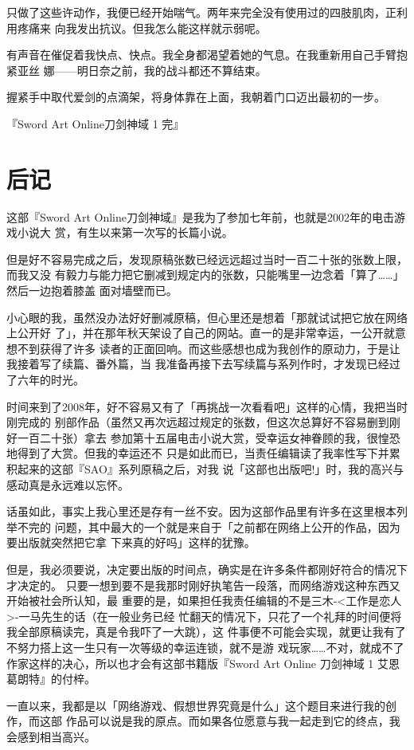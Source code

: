 \documentclass[11pt]{book}
\begin{document}
只做了这些许动作，我便已经开始喘气。两年来完全没有使用过的四肢肌肉，正利用疼痛来
向我发出抗议。但我怎么能这样就示弱呢。

有声音在催促着我快点、快点。我全身都渴望着她的气息。在我重新用自己手臂抱紧亚丝
娜——明日奈之前，我的战斗都还不算结束。

握紧手中取代爱剑的点滴架，将身体靠在上面，我朝着门口迈出最初的一步。

『Sword Art Online刀剑神域 1 完』
\chapter{后记}
\label{sec:org4f12859}
这部『Sword Art Online刀剑神域』是我为了参加七年前，也就是2002年的电击游戏小说大
赏，有生以来第一次写的长篇小说。

但是好不容易完成之后，发现原稿张数已经远远超过当时一百二十张的张数上限，而我又没
有毅力与能力把它删减到规定内的张数，只能嘴里一边念着「算了……」然后一边抱着膝盖
面对墙壁而已。

小心眼的我，虽然没办法好好删减原稿，但心里还是想着「那就试试把它放在网络上公开好
了」，并在那年秋天架设了自己的网站。直一的是非常幸运，一公开就意想不到获得了许多
读者的正面回响。而这些感想也成为我创作的原动力，于是让我接着写了续篇、番外篇，当
我准备再接下去写续篇与系列作时，才发现已经过了六年的时光。

时间来到了2008年，好不容易又有了「再挑战一次看看吧」这样的心情，我把当时刚完成的
别部作品（虽然又再次远超过规定的张数，但这次总算好不容易删到刚好一百二十张）拿去
参加第十五届电击小说大赏，受幸运女神眷顾的我，很惶恐地得到了大赏。但我的幸运还不
只是如此而已，当责任编辑读了我率性写下并累积起来的这部『SAO』系列原稿之后，对我
说「这部也出版吧!」时，我的高兴与感动真是永远难以忘怀。

话虽如此，事实上我心里还是存有一丝不安。因为这部作品里有许多在这里根本列举不完的
问题，其中最大的一个就是来自于「之前都在网络上公开的作品，因为要出版就突然把它拿
下来真的好吗」这样的犹豫。

但是，我必须要说，决定要出版的时间点，确实是在许多条件都刚好符合的情况下才决定的。
只要一想到要不是我那时刚好执笔告一段落，而网络游戏这种东西又开始被社会所认知，最
重要的是，如果担任我责任编辑的不是三木-<工作是恋人>-一马先生的话（在一般业务已经
忙翻天的情况下，只花了一个礼拜的时间便将我全部原稿读完，真是令我吓了一大跳），这
件事便不可能会实现，就更让我有了不努力搭上这一生只有一次等级的幸运连锁，就不是游
戏玩家……不对，就成不了作家这样的决心，所以也才会有这部书籍版『Sword Art Online
刀剑神域 1 艾恩葛朗特』的付梓。

一直以来，我都是以「网络游戏、假想世界究竟是什么」这个题目来进行我的创作，而这部
作品可以说是我的原点。而如果各位愿意与我一起走到它的终点，我会感到相当高兴。
\end{document}

